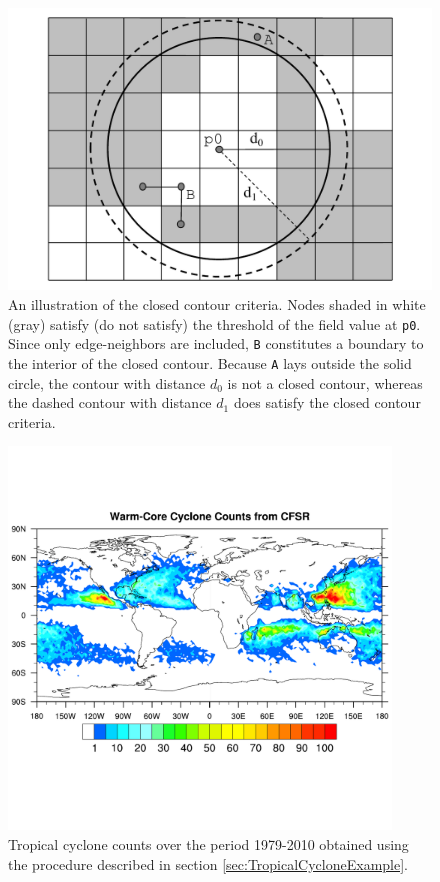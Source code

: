 \documentclass[gmdd, hvmath, online]{copernicus_discussions}
\begin{document}
\begin{figure}[H]
\begin{center}
\includegraphics[width=5in]{ClosedContourCriteria2.pdf}
\end{center}
\caption{An illustration of the closed contour criteria.  Nodes shaded in white (gray) satisfy (do not satisfy) the threshold of the field value at \texttt{p0}.  Since only edge-neighbors are included, \texttt{B} constitutes a boundary to the interior of the closed contour.  Because \texttt{A} lays outside the solid circle, the contour with distance $d_0$ is not a closed contour, whereas the dashed contour with distance $d_1$ does satisfy the closed contour criteria.} \label{fig:ClosedContour}
\end{figure}

\begin{figure}[H]
\begin{center}
\includegraphics[width=4in, clip, trim=0.2cm 3.6cm 0.2cm 3.1cm]{plot-cfsr_tc_density.pdf}
\end{center}
\caption{Tropical cyclone counts over the period 1979-2010 obtained using the procedure described in section \ref{sec:TropicalCycloneExample}.} \label{fig:TropicalCycloneDensity}
\end{figure}
\end{document}
